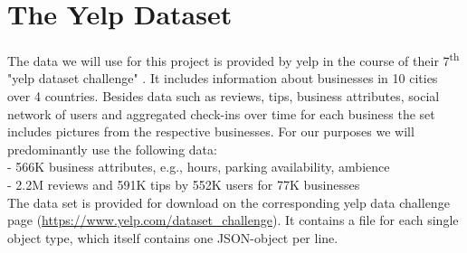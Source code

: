 \section{The Yelp Dataset} %
\label{cha:yelp}
The data we will use for this project is provided by yelp in the course of their 7\textsuperscript{th} "yelp dataset challenge" %
. It includes information about businesses in 10 cities over 4 countries. Besides data such as reviews, tips, business attributes, social network of users and aggregated check-ins over time for each business the set includes pictures from the respective businesses. For our purposes we will predominantly use the following data: \\
   - 	566K business attributes, e.g., hours, parking availability, ambience\\
   - 	2.2M reviews and 591K tips by 552K users for 77K businesses\\
The data set is provided for download on the corresponding yelp data challenge page (\url{https://www.yelp.com/dataset_challenge}). It contains a file for each single object type, which itself contains one JSON-object per line. %

